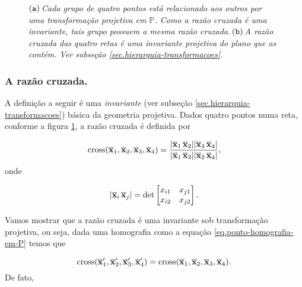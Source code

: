 \begin{figure}[!htb]
\centering
{}
\quad
{}
\caption{$({\tt a})\,$\textit{Cada grupo de quatro pontos está relacionado aos outros por uma transformação projetiva em ${\mathbb{P}}$. Como a razão cruzada é uma invariante, tais grupo possuem a mesma razão cruzada.}$\,({\tt b})\,$\textit{A razão cruzada das quatro retas é uma invariante projetiva do plano que as contém. Ver subseção \ref{sec.hierarquia-transformacoes}.}}
\label{fig.razao-cruzada}
\end{figure}

\subsubsection*{A razão cruzada.}
A definição a seguir é uma \textit{invariante} (ver subseção \ref{sec.hierarquia-transformacoes}) básica da geometria projetiva. Dados quatro pontos numa reta, conforme a figura \ref{fig.razao-cruzada}, a razão cruzada é definida por 

\begin{equation*}
\text{cross}(\overline{\mathbf{x}}_1,\overline{\mathbf{x}}_2,\overline{\mathbf{x}}_3,\overline{\mathbf{x}}_4)=\frac{|\overline{\mathbf{x}}_1\,\overline{\mathbf{x}}_2||\overline{\mathbf{x}}_3\,\overline{\mathbf{x}}_4|}{|\overline{\mathbf{x}}_1\,\overline{\mathbf{x}}_3||\overline{\mathbf{x}}_2\,\overline{\mathbf{x}}_4|},
\end{equation*}
onde 

\begin{equation*}
|\overline{\mathbf{x}}_i\,\overline{\mathbf{x}}_j|=
\text{det}
\begin{bmatrix}
x_{i1}&x_{j1}\\
x_{i2}&x_{j2}
\end{bmatrix}.
\end{equation*}

Vamos mostrar que a razão cruzada é uma invariante sob transformação projetiva, ou seja, dada uma homografia como a equação \ref{eq.ponto-homografia-em-P} temos que 

\begin{equation}\label{eq.invariante-cross}
\text{cross}(\overline{\mathbf{x}}'_1,\overline{\mathbf{x}}'_2,\overline{\mathbf{x}}'_3,\overline{\mathbf{x}}'_4)=\text{cross}(\overline{\mathbf{x}}_1,\overline{\mathbf{x}}_2,\overline{\mathbf{x}}_3,\overline{\mathbf{x}}_4).
\end{equation}
De fato,

